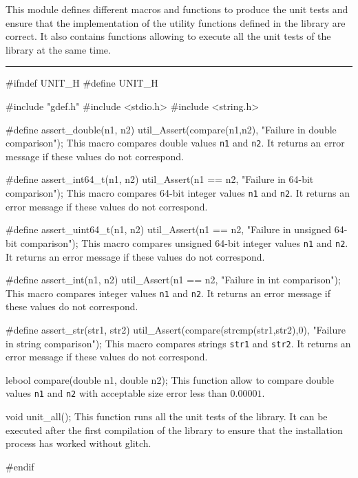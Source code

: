 
This module defines different macros and functions to produce the unit tests and ensure that the implementation of the utility functions defined in the library are correct. It also contains functions allowing to execute all the unit tests of the library at the same time.

\bigskip
\hrule
\code
\hide
#ifndef UNIT_H
#define UNIT_H
\endhide

#include "gdef.h"
#include <stdio.h>
#include <string.h>

#define assert_double(n1, n2) util_Assert(compare(n1,n2), "Failure in double comparison");
\endcode
 \tab  This macro compares double values {\tt n1} and {\tt n2}. It returns an error message if these values do not correspond.
 \endtab
\code

#define assert_int64_t(n1, n2) util_Assert(n1 == n2, "Failure in 64-bit comparison");
\endcode
 \tab  This macro compares 64-bit integer values {\tt n1} and {\tt n2}. It returns an error message if these values do not correspond.
 \endtab
\code

#define assert_uint64_t(n1, n2) util_Assert(n1 == n2, "Failure in unsigned 64-bit comparison");
\endcode
 \tab  This macro compares unsigned 64-bit integer values {\tt n1} and {\tt n2}. It returns an error message if these values do not correspond.
 \endtab
\code

#define assert_int(n1, n2) util_Assert(n1 == n2, "Failure in int comparison");
\endcode
 \tab  This macro compares integer values {\tt n1} and {\tt n2}. It returns an error message if these values do not correspond.
 \endtab
\code

#define assert_str(str1, str2) util_Assert(compare(strcmp(str1,str2),0), "Failure in string comparison");
\endcode
 \tab  This macro compares strings {\tt str1} and {\tt str2}. It returns an error message if these values do not correspond.
 \endtab
\code

lebool compare(double n1, double n2);
\endcode
 \tab  This function allow to compare double values {\tt n1} and {\tt n2} with acceptable size error less than $0.00001$.
 \endtab
\code

void unit_all();
\endcode
 \tab  This function runs all the unit tests of the library. It can be executed after the first compilation of the library to ensure that the installation process has worked without glitch.
 \endtab
\code

\hide
#endif
\endhide
\endcode
